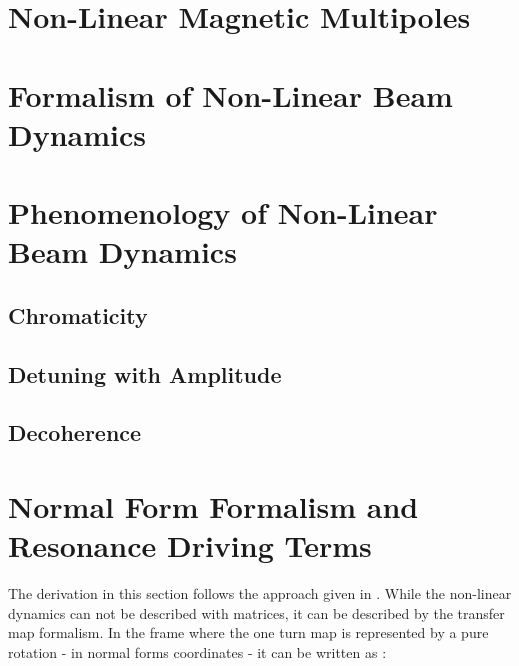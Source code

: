
\section{Non-Linear Magnetic Multipoles}


\section{Formalism of Non-Linear Beam Dynamics}


\section{Phenomenology of Non-Linear Beam Dynamics}

\subsection{Chromaticity}

\subsection{Detuning with Amplitude}

\subsection{Decoherence}


\section{Normal Form Formalism and Resonance Driving Terms}


The derivation in this section follows the approach given in \cite{Tomas_thesis, Franchi_thesis}.
While the non-linear dynamics can not be described with matrices, it can be described by the transfer map formalism.
In the frame where the one turn map is represented by a pure rotation - in normal forms coordinates - it can be written as \cite{Tomas_thesis}:\\

